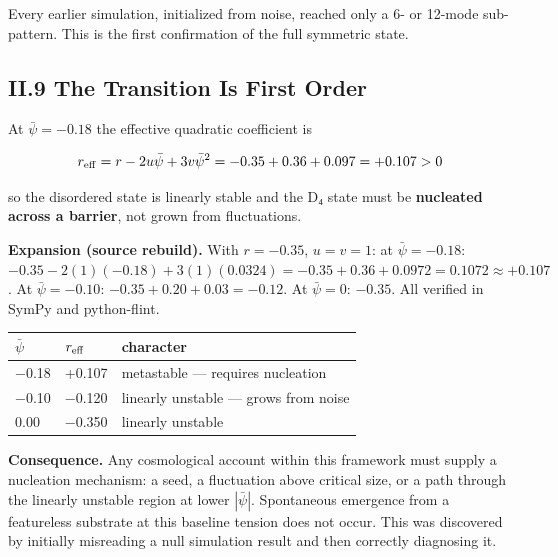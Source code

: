 \documentclass[a4paper,11pt]{article}
\newcommand{\expansion}[1]{\par\smallskip\noindent\textbf{Expansion (source rebuild).} #1\par\smallskip}
\begin{document}
Every earlier simulation, initialized from noise, reached only a 6- or 12-mode sub-pattern. This is the first confirmation of the full symmetric state.

\subsection*{II.9 The Transition Is First Order}

At $\bar\psi=-0.18$ the effective quadratic coefficient is

\[r_{\rm eff}=r-2u\bar\psi+3v\bar\psi^2=-0.35+0.36+0.097=+0.107>0\]

so the disordered state is linearly stable and the D₄ state must be \textbf{nucleated across a barrier}, not grown from fluctuations.


\expansion{With $r = -0.35$, $u = v = 1$: at $\bar{\psi} = -0.18$: $-0.35 - 2(1)(-0.18) + 3(1)(0.0324) = -0.35 + 0.36 + 0.0972 = 0.1072 \approx +0.107$. At $\bar{\psi} = -0.10$: $-0.35 + 0.20 + 0.03 = -0.12$. At $\bar{\psi} = 0$: $-0.35$. All verified in SymPy and python-flint.}
\begin{center}
\begin{tabular}{lll}
\hline
$\bar\psi$ & $r_{\rm eff}$ & character \\
\hline
$-$0.18 & +0.107 & metastable — requires nucleation \\
$-$0.10 & $-$0.120 & linearly unstable — grows from noise \\
0.00 & $-$0.350 & linearly unstable \\
\hline
\end{tabular}
\end{center}

\textbf{Consequence.} Any cosmological account within this framework must supply a nucleation mechanism: a seed, a fluctuation above critical size, or a path through the linearly unstable region at lower $|\bar\psi|$. Spontaneous emergence from a featureless substrate at this baseline tension does not occur. This was discovered by initially misreading a null simulation result and then correctly diagnosing it.
\end{document}
